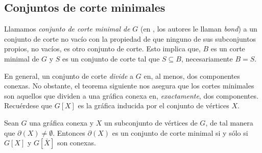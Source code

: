 \subsection{Conjuntos de corte minimales}

Llamamos \textit{conjunto de corte minimal de}  $G$ (en \cite{Bondy}, los autores le llaman \textit{bond}) a un conjunto de corte no vacío con la propiedad de que ninguno de sus subconjuntos propios, no vacíos, es otro conjunto de corte. Esto implica que, $B$ es un corte minimal de $G$ y $S$ es un conjunto de corte tal que $S\subseteq B$, necesariamente $B=S$.

 En general, un conjunto de corte \textit{divide} a $G$ en, al menos, dos componentes conexas. No obstante, el teorema siguiente nos asegura que los cortes minimales son aquellos que dividen a una gráfica conexa en, \textit{exactamente}, dos componentes. Recuérdese que $G[X]$ es la gráfica inducida por el conjunto de vértices $X$.
\vspace{1 cm}
\begin{teo} \label{teo:caracterizacionbond}
Sean $G$ una gráfica conexa y $X$ un subconjunto de vértices de $G$, de tal manera que $\partial(X) \neq \emptyset$. Entonces $\partial(X)$ es un conjunto de corte minimal si y sólo si $G[X]$ y $G[\bar{X}]$ son conexas. 
\end{teo}

